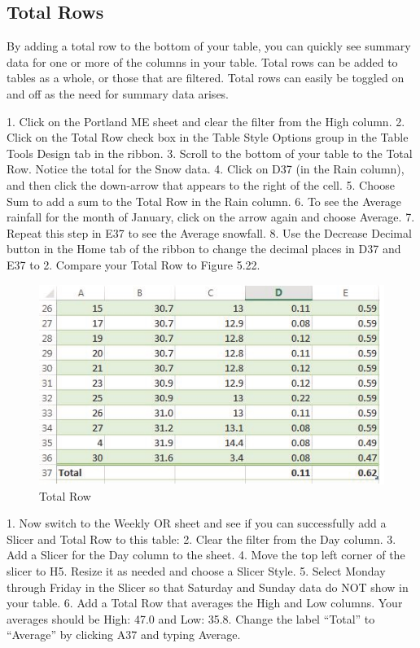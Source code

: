 \subsection{Total Rows}

By adding a total row to the bottom of your table, you can quickly see summary data for one or more
of the columns in your table. Total rows can be added to tables as a whole, or those that are filtered.
Total rows can easily be toggled on and off as the need for summary data arises.

1. Click on the Portland ME sheet and clear the filter from the High column.
2. Click on the Total Row check box in the Table Style Options group in the Table Tools Design tab
in the ribbon.
3. Scroll to the bottom of your table to the Total Row. Notice the total for the Snow data.
4. Click on D37 (in the Rain column), and then click the down-arrow that appears to the right of
the cell.
5. Choose Sum to add a sum to the Total Row in the Rain column.
6. To see the Average rainfall for the month of January, click on the arrow again and choose
Average.
7. Repeat this step in E37 to see the Average snowfall.
8. Use the Decrease Decimal button in the Home tab of the ribbon to change the decimal places in
D37 and E37 to 2. Compare your Total Row to Figure 5.22.

\begin{figure}[H]
	\centering
	\includegraphics[width=\maxwidth{.95\linewidth}]{gfx/ch05_fig22}
	\caption{Total Row}
	\label{05:fig22}
\end{figure}





1. Now switch to the Weekly OR sheet and see if you can successfully add a Slicer and Total Row
to this table:
2. Clear the filter from the Day column.
3. Add a Slicer for the Day column to the sheet.
4. Move the top left corner of the slicer to H5. Resize it as needed and choose a Slicer Style.
5. Select Monday through Friday in the Slicer so that Saturday and Sunday data do NOT show in
your table.
6. Add a Total Row that averages the High and Low columns. Your averages should be High: 47.0
and Low: 35.8. Change the label “Total” to “Average” by clicking A37 and typing Average.


